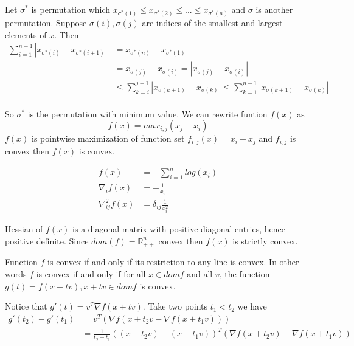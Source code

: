 \documentclass[12pt,letterpaper]{article}
\begin{document}
\begin{alphalist}
\item Let $\sigma^{*}$ is permutation which $x_{\sigma^{*}(1)} \le
    x_{\sigma^{*}(2)} \le...\le x_{\sigma^{*}(n)}$ and $\sigma$ is another
    permutation. Suppose $\sigma(i), \sigma(j)$ are indices of the smallest and
    largest elements of $x$. Then
    \[
        \begin{split}
            \sum_{i=1}^{n-1} |x_{\sigma^{*}(i)} - x_{\sigma^{*}(i+1)}|
            &= x_{\sigma^{*}(n)} - x_{\sigma^{*}(1)} \\
            &= x_{\sigma(j)} - x_{\sigma(i)} = |x_{\sigma(j)} - x_{\sigma(i)}| \\
            &\le \sum_{k=i}^{j-1} | x_{\sigma(k+1)} - x_{\sigma(k)}|
            \le \sum_{k=1}^{n-1} | x_{\sigma(k+1)} - x_{\sigma(k)}| \\
        \end{split}
    \]

    So $\sigma^{*}$ is the permutation with minimum value. We can rewrite
    funtion $f(x)$ as
    \[
        f(x) = max_{i,j} (x_j - x_i)
    \]
    $f(x)$ is pointwise maximization of function set $f_{i,j}(x) = x_i - x_j$
    and $f_{i,j}$ is convex then $f(x)$ is convex.

\item
    \[
        \begin{split}
            f(x) &= -\sum_{i=1}^n log(x_i)\\
            \nabla_{i}f(x) &= -\frac{1}{x_i}\\
            \nabla_{ij}^2 f(x) &= \delta_{ij} \frac{1}{x_i^2}
        \end{split}
    \]

    Hessian of $f(x)$ is a diagonal matrix with positive diagonal entries,
    hence positive definite. Since $dom(f) = \mathbb{R}_{++}^n$ convex then $f(x)$ is strictly convex.

\item
    Function $f$ is convex if and only if its restriction to any line is
    convex. In other words $f$ is convex if and only if for all $x \in dom
    f$ and all $v$, the function $g(t) = f(x + tv), x + tv \in dom f$ is convex.

    Notice that $g'(t) = v^T\nabla f(x + tv)$. Take two points $t_1 < t_2$ we have
    \[
        \begin{split}
            g'(t_2) - g'(t_1) &= v^T(\nabla f(x + t_2v - \nabla f(x + t_1v))) \\
                            &= \frac{1}{t_2-t_1} ((x + t_2v) - (x +
                            t_1v))^T (\nabla f(x + t_2v) - \nabla f(x + t_1v))
        \end{split}
    \]


\end{alphalist}
\end{document}
